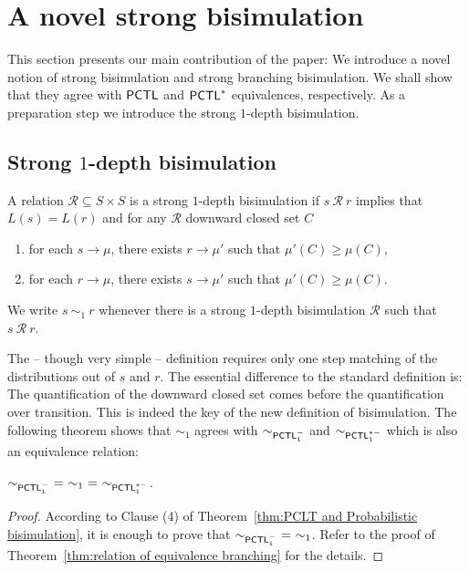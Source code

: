 \documentclass{LMCS}
\newcommand{\TRAN}[2]{#1\rightarrow #2}
\newcommand{\PCTL}{{\sf PCTL}}
\newcommand{\iBS}[1]{\sim_{#1}}
\newcommand{\iEPCTLM}[1]{\sim_{\PCTL^{-}_{#1}}}
\newcommand{\iEPCTLSM}[1]{\sim_{\PCTL_{#1}^{*-}}}
\newcommand{\MC}[1]{\mathcal{#1}}
\begin{document}
\section{A novel strong bisimulation}\label{sec:strong}
This section presents our main contribution of the paper: We introduce a novel notion of  strong bisimulation and strong branching bisimulation. We shall show that they agree with  $\PCTL$ and $\PCTL^{*}$ equivalences, respectively.
As a preparation step we introduce the strong $1$-depth bisimulation.

\subsection{Strong \texorpdfstring{$1$}{1}-depth bisimulation}\label{sec:1 depth bisimulation}
\begin{defi}\label{def:1 depth bisimualtion}
A relation $\MC{R}\subseteq S\times S$ is a
strong $1$-depth bisimulation if $s~\MC{R}~r$ implies that $L(s)=L(r)$ and for any $\MC{R}$ downward closed set $C$
\begin{enumerate}[(1)]
\item for each $\TRAN{s}{\mu}$, there exists $\TRAN{r}{\mu'}$ such that $\mu'(C)\geq\mu(C)$,
\item for each $\TRAN{r}{\mu}$, there exists $\TRAN{s}{\mu'}$ such that $\mu'(C)\geq\mu(C)$.\medskip
\end{enumerate}

\noindent We write $s~\iBS{1}~r$ whenever there is a strong $1$-depth bisimulation $\MC{R}$ such that $s~\MC{R}~r$.
\end{defi}

The -- though very simple -- definition  requires only one step matching
of the distributions out of $s$ and $r$. The essential
difference to the standard definition is: The quantification of the downward closed set
comes before the quantification over transition. This is indeed the key of the new definition of bisimulation. The following theorem shows that $\iBS{1}$ agrees with $\iEPCTLM{1}$ and $\iEPCTLSM{1}$ which is also an equivalence relation:

\begin{lem}\label{thm:1 equivalence}
$\iEPCTLM{1}~=~\iBS{1}~=~\iEPCTLSM{1}$.
\end{lem}
\begin{proof}
  According to Clause (4) of Theorem~\ref{thm:PCLT and Probabilistic
    bisimulation}, it is enough to prove that
  $\iEPCTLM{1}~=~\iBS{1}$. Refer to the proof of
  Theorem~\ref{thm:relation of equivalence branching} for the details.
\end{proof}
\end{document}
